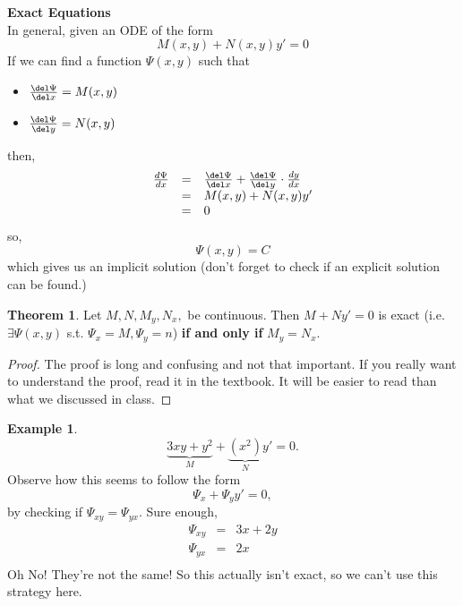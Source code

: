 \documentclass[a5paper]{article}
\theoremstyle{definition}%
\newtheorem*{theorem*}{Theorem} %
\newtheorem*{example*}{Example}
\numberwithin{exercise}{section}
\theoremstyle{remark}%
\begin{document}
\begin{highlight}
\textbf{Exact Equations}\\
In general, given an ODE of the form 
$$M(x,y)+ N(x,y)y'=0$$
If we can find a function $\Psi(x,y)$ such that 
\begin{itemize}
\item $\frac{\del\Psi}{\del x}=M(x,y)$
\item $\frac{\del\Psi}{\del y}=N(x,y)$
\end{itemize}
then, 
\[\begin{array}{rcl}
\frac{d\Psi}{d x}&=&\frac{\del\Psi}{\del x} + \frac{\del\Psi}{\del y}\cdot \frac{dy}{dx}\\
&=&M(x,y)+ N(x,y)y'\\
&=&0
\end{array}\]
so, $$\Psi(x,y)=C$$ which gives us an implicit solution (don't forget to check if an explicit solution can be found.)
\end{highlight}

\begin{theorem*}
Let $M, N, M_y, N_x,$ be continuous. Then $M+Ny'=0$ is exact (i.e. $\exists \Psi(x,y)$ s.t. $\Psi_x=M, \Psi_y=n$) \textbf{if and only if} $M_y=N_x$. 
\end{theorem*}

\begin{proof}
The proof is long and confusing and not that important. If you really want to understand the proof, read it in the textbook. It will be easier to read than what we discussed in class. 
\end{proof}

\begin{highlight}
\begin{example*}
$$\underbrace{3xy+y^2}_M+\underbrace{(x^2)}_Ny'=0.$$ Observe how this seems to follow the form 
$$\Psi_x + \Psi_yy'=0,$$
by checking if $\Psi_{xy} = \Psi_{yx}$. Sure enough, 
\[\begin{array}{rcl}
\Psi_{xy} &=& 3x+2y\\
\Psi_{yx} &=& 2x\\
\end{array}\]
Oh No! They're not the same! So this actually isn't exact, so we can't use this strategy here. 
\end{example*}
\end{highlight}
\end{document}
